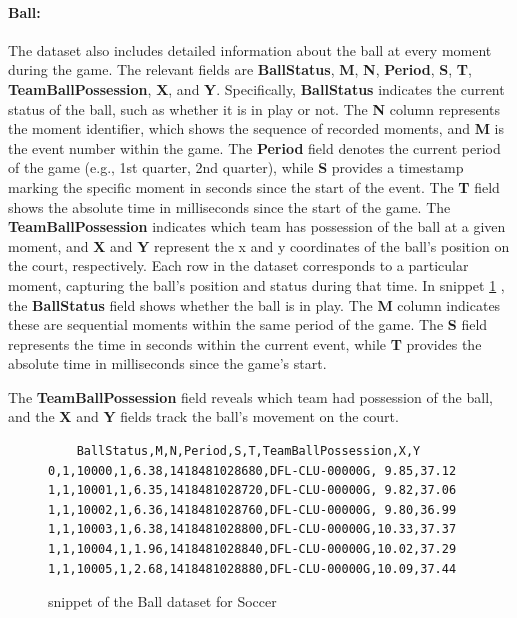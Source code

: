 \paragraph {Ball:}
\label{sect:ball}
The dataset also includes detailed information about the ball at every moment during the game. The relevant fields are \textbf{BallStatus}, \textbf{M}, \textbf{N}, \textbf{Period}, \textbf{S}, \textbf{T}, \textbf{TeamBallPossession}, \textbf{X}, and \textbf{Y}. Specifically, \textbf{BallStatus} indicates the current status of the ball, such as whether it is in play or not. The \textbf{N} column represents the moment identifier, which shows the sequence of recorded moments, and \textbf{M} is the event number within the game. The \textbf{Period} field denotes the current period of the game (e.g., 1st quarter, 2nd quarter), while \textbf{S} provides a timestamp marking the specific moment in seconds since the start of the event. The \textbf{T} field shows the absolute time in milliseconds since the start of the game. The \textbf{TeamBallPossession} indicates which team has possession of the ball at a given moment, and \textbf{X} and \textbf{Y} represent the x and y coordinates of the ball’s position on the court, respectively. Each row in the dataset corresponds to a particular moment, capturing the ball's position and status during that time. In snippet \ref{fig:ball-dataset} , the \textbf{BallStatus} field shows whether the ball is in play. The \textbf{M} column indicates these are sequential moments within the same period of the game. The \textbf{S} field represents the time in seconds within the current event, while \textbf{T} provides the absolute time in milliseconds since the game's start.

The \textbf{TeamBallPossession} field reveals which team had possession of the ball, and the \textbf{X} and \textbf{Y} fields track the ball's movement on the court.

\begin{figure}[H]
    \centering
    \begin{BVerbatim}
    BallStatus,M,N,Period,S,T,TeamBallPossession,X,Y
0,1,10000,1,6.38,1418481028680,DFL-CLU-00000G, 9.85,37.12
1,1,10001,1,6.35,1418481028720,DFL-CLU-00000G, 9.82,37.06
1,1,10002,1,6.36,1418481028760,DFL-CLU-00000G, 9.80,36.99
1,1,10003,1,6.38,1418481028800,DFL-CLU-00000G,10.33,37.37
1,1,10004,1,1.96,1418481028840,DFL-CLU-00000G,10.02,37.29
1,1,10005,1,2.68,1418481028880,DFL-CLU-00000G,10.09,37.44
    \end{BVerbatim}
    \caption{snippet of the Ball dataset for Soccer}
    \label{fig:ball-dataset}
\end{figure}



